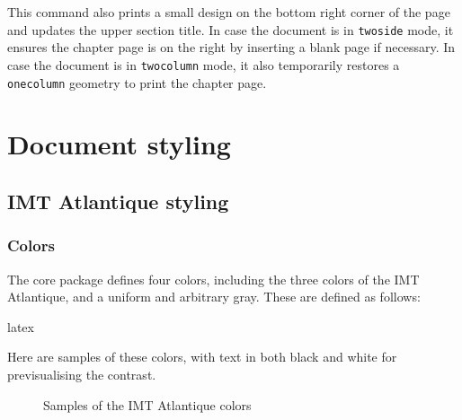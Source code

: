 \documentclass{report}
\begin{document}
This command also prints a small design on the bottom right corner of the page and updates the upper section title. 
In case the document is in \texttt{twoside} mode, it ensures the chapter page is on the right by inserting a blank page if necessary. 
In case the document is in \texttt{twocolumn} mode, it also temporarily restores a \texttt{onecolumn} geometry to print the chapter page.


\clearpage
\section{Document styling}

\subsection{IMT Atlantique styling}
\subsubsection{Colors}
The core package defines four colors, including the three colors of the IMT Atlantique, and a uniform and arbitrary gray.
These are defined as follows:

\begin{imtaCode}{latex}
\end{imtaCode}

Here are samples of these colors, with text in both black and white for previsualising the contrast.

\begin{figure}[H]
    \centering
    \caption{Samples of the IMT Atlantique colors}
    \label{fig:imtaColors}
\end{figure}
\end{document}
